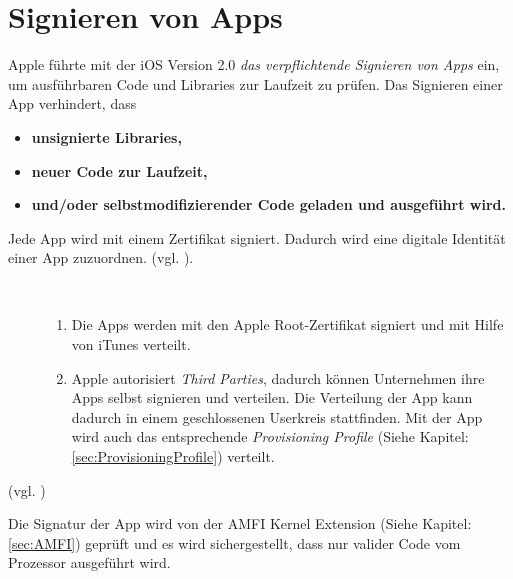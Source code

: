 \section{Signieren von Apps}
\label{sec:SigningProcess}

Apple führte mit der iOS Version 2.0 \textit{\glqq das verpflichtende Signieren von Apps\grqq{}} ein, um ausführbaren Code und Libraries zur Laufzeit zu prüfen. Das Signieren einer App verhindert, dass 
\begin{itemize}
    \item \textbf{unsignierte Libraries,
}    \item \textbf{neuer Code zur Laufzeit,} 
    \item \textbf{und/oder selbstmodifizierender Code geladen und ausgeführt wird.}
\end{itemize}
Jede App wird mit einem Zertifikat signiert. Dadurch wird eine digitale Identität einer App zuzuordnen. (vgl. \cite{Cert[2], Cert[3]}).
\begin{description}
    \item[\parbox{\textwidth} {Eine App kann auf zwei Arten signiert werden}]~\par
   \begin{enumerate}
        \item Die Apps werden mit den Apple Root-Zertifikat signiert und mit Hilfe von iTunes verteilt. 
        
        \item Apple autorisiert \textit{\glqq Third Parties\grqq}, dadurch können Unternehmen ihre Apps selbst signieren und verteilen. Die Verteilung der App kann dadurch in einem geschlossenen Userkreis stattfinden. Mit der App wird auch das entsprechende \textit{\glqq Provisioning Profile\grqq{}} (Siehe Kapitel: \ref{sec:ProvisioningProfile}) verteilt.
    \end{enumerate} 
\end{description} 
(vgl. \cite{Sign[1], Sign[2], Sign[3], Sign[4], Sign[5], ROP[1]}) \par 
Die Signatur der App wird von der AMFI Kernel Extension (Siehe Kapitel: \ref{sec:AMFI}) geprüft und es wird sichergestellt, dass nur valider Code vom Prozessor ausgeführt wird.    
 
